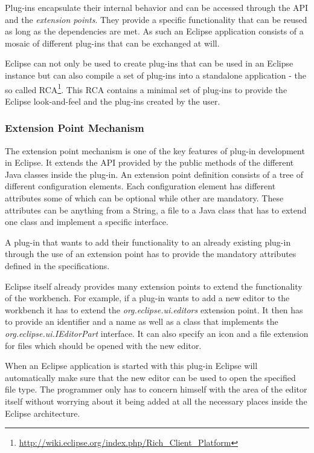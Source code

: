 Plug-ins encapsulate their internal behavior and can be accessed through the \ac{API} and the 
\textit{extension points}. They provide a specific functionality that can be reused as long as
the dependencies are met. As such an Eclipse application consists of a mosaic of different
plug-ins that can be exchanged at will.

Eclipse can not only be used to create plug-ins that can be used in an Eclipse
instance but can also compile a set of plug-ins into a standalone application - the so
called \ac{RCA}\footnote{\url{http://wiki.eclipse.org/index.php/Rich_Client_Platform}}. 
This \ac{RCA} contains a minimal set of plug-ins to provide the Eclipse
look-and-feel and the plug-ins created by the user.

\subsubsection{Extension Point Mechanism}
\label{section:ConfTechExtension}
The extension point mechanism is one of the key features of plug-in development in Eclipse.
It extends the \ac{API} provided by the public methods of the different Java classes inside
the plug-in. An extension point definition consists of a tree of different configuration elements.
Each configuration element has different attributes some of which can be optional while other
are mandatory. These attributes can be anything from a String, a file to a Java class that has
to extend one class and implement a specific interface.

A plug-in that wants to add their functionality to an already existing plug-in
through the use of an extension point has to provide the mandatory attributes defined in the 
specifications.

Eclipse itself already provides many extension points to extend the functionality of the workbench.
For example, if a plug-in wants to add a new editor to the workbench it has to extend the 
\textit{org.eclipse.ui.editors} extension point. It then has to provide an identifier and a name
as well as a class that implements the \textit{org.eclipse.ui.IEditorPart} interface. It can also specify an
icon and a file extension for files which should be opened with the new editor.

When an Eclipse application is started with this plug-in Eclipse will automatically make sure that the new editor
can be used to open the specified file type. The programmer only has to concern himself with the area of the editor
itself without worrying about it being added at all the necessary places inside the Eclipse architecture.

